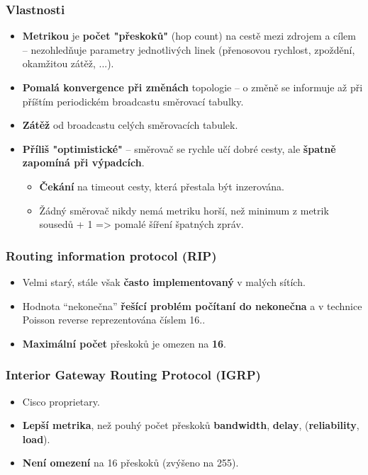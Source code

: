 \subsubsection*{Vlastnosti}
\begin{itemize}
\item \textbf{Metrikou} je \textbf{počet "přeskoků"} (hop count) na cestě mezi zdrojem a cílem -- nezohledňuje parametry jednotlivých linek (přenosovou rychlost, zpoždění, okamžitou zátěž, ...).
\item \textbf{Pomalá konvergence při změnách} topologie -- o změně se informuje až při příštím periodickém broadcastu směrovací tabulky.
\item \textbf{Zátěž }od broadcastu celých směrovacích tabulek.
\item \textbf{Příliš "optimistické"} -- směrovač se rychle učí dobré cesty, ale \textbf{špatně zapomíná při výpadcích}.
\begin{itemize}
	\item \textbf{Čekání} na timeout cesty, která přestala být inzerována.
	\item Žádný směrovač nikdy nemá metriku horší, než minimum z metrik sousedů + 1 => pomalé šíření špatných zpráv.
\end{itemize}
\end{itemize}

\subsubsection{Routing information protocol (RIP)}
\begin{itemize}
	\item Velmi starý, stále však \textbf{často implementovaný} v malých sítích.
	\item Hodnota “nekonečna” \textbf{řešící problém počítaní do nekonečna} a v technice Poisson reverse reprezentována číslem 16..
	\item \textbf{Maximální počet} přeskoků je omezen na \textbf{16}.
\end{itemize}

\subsubsection{Interior Gateway Routing Protocol (IGRP)}
\begin{itemize}
\item Cisco proprietary.
\item \textbf{Lepší metrika}, než pouhý počet přeskoků \textbf{bandwidth}, \textbf{delay}, (\textbf{reliability}, \textbf{load}).
\item \textbf{Není omezení }na 16 přeskoků (zvýšeno na 255).
\end{itemize}

